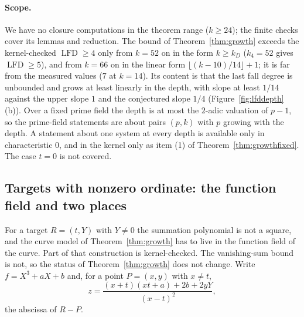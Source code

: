 \documentclass[11pt]{article}
\theoremstyle{definition}\newtheorem{definition}[theorem]{Definition}
\theoremstyle{remark}\newtheorem{remark}[theorem]{Remark}
\newcommand{\lfd}{\operatorname{LFD}}
\begin{document}
\paragraph{Scope.} We have no closure computations in the theorem range
($k\ge24$); the finite checks cover its lemmas and reduction. The bound of
Theorem~\ref{thm:growth} exceeds the kernel-checked $\lfd\ge4$ only from
$k=52$ on in the form $k\ge k_D$ ($k_4=52$ gives $\lfd\ge5$), and from
$k=66$ on in the linear form $\lfloor(k-10)/14\rfloor+1$; it is far from
the measured values ($7$ at $k=14$). Its content is that the last fall
degree is unbounded and grows at least linearly in the depth, with slope at
least $1/14$ against the upper slope $1$ and the conjectured slope $1/4$
(Figure~\ref{fig:lfddepth}(b)). Over a fixed prime field the depth is at
most the $2$-adic valuation of $p-1$, so the prime-field statements are
about pairs $(p,k)$ with $p$ growing with the depth. A statement about one
system at every depth is available only in characteristic $0$, and in the
kernel only as item (1) of Theorem~\ref{thm:growthfixed}. The case $t=0$ is
not covered.

\subsection{Targets with nonzero ordinate: the function field and two places}\label{sec:growthnontorsion}
For a target $R=(t,Y)$ with $Y\ne0$ the summation polynomial is not a
square, and the curve model of Theorem~\ref{thm:growth} has to live in the
function field of the curve. Part of that construction is
kernel-checked. The vanishing-sum bound is not, so the status of
Theorem~\ref{thm:growth} does not change. Write $f=X^3+aX+b$ and, for a
point $P=(x,y)$ with $x\ne t$,
\[
 z=\frac{(x+t)(xt+a)+2b+2yY}{(x-t)^2},
\]
the abscissa of $R-P$.
\end{document}
